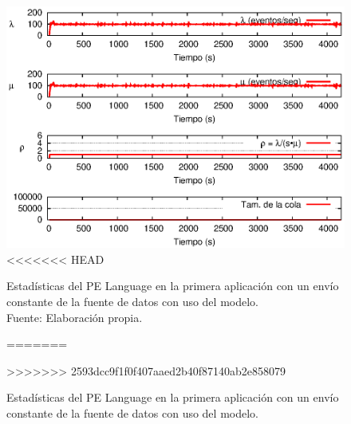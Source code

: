 \begin{figure}[!ht]
    \centering
    \captionsetup{justification=centering}
    \includegraphics[scale=1.1]{images/exp/app1/uniform/cm/statusLanguagePE.eps}
<<<<<<< HEAD
    \caption[Estadísticas del PE Language en la primera aplicación con un envío constante de la fuente de datos con uso del modelo.]{Estadísticas del PE Language en la primera aplicación con un envío constante de la fuente de datos con uso del modelo.\\Fuente: Elaboración propia.}
=======
    \caption{Estad\'isticas del PE Language en la primera aplicaci\'on con un env\'io constante de la fuente de datos con uso del modelo.}
>>>>>>> 2593dcc9f1f0f407aaed2b40f87140ab2e858079
    \label{fig:app1-uniform-statusLanguagePE-cm}
\end{figure}


